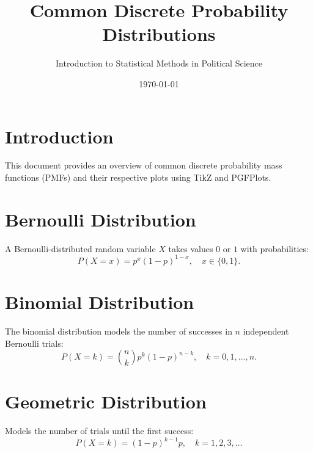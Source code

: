 \documentclass{article}
\begin{document}
\title{Common Discrete Probability Distributions}
\author{Introduction to Statistical Methods in Political Science}
\date{\today}
\maketitle

\section{Introduction}
This document provides an overview of common discrete probability mass functions (PMFs) and their respective plots using TikZ and PGFPlots.

\section{Bernoulli Distribution}
A Bernoulli-distributed random variable $X$ takes values $0$ or $1$ with probabilities:
\[ P(X = x) = p^x (1 - p)^{1-x}, \quad x \in \{0,1\}. \]


\section{Binomial Distribution}
The binomial distribution models the number of successes in $n$ independent Bernoulli trials:
\[ P(X = k) = \binom{n}{k} p^k (1 - p)^{n - k}, \quad k = 0,1,\dots,n. \]


\section{Geometric Distribution}
Models the number of trials until the first success:
\[ P(X = k) = (1 - p)^{k - 1} p, \quad k = 1,2,3,\dots \]
\end{document}
